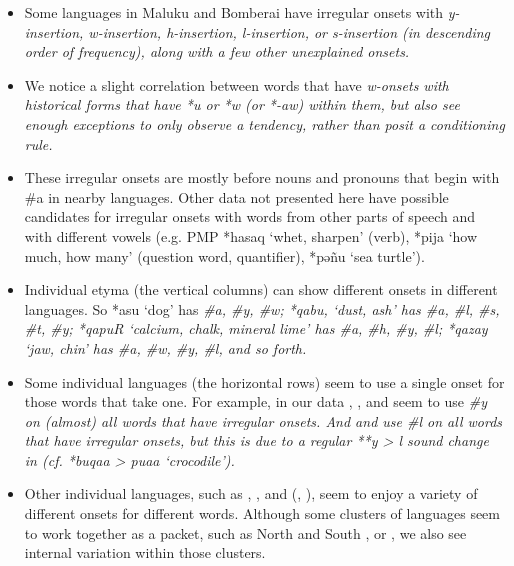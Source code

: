 \begin{itemize}
		\item	Some languages in Maluku
					and Bomberai have irregular onsets with \it{y}-insertion,
					\it{w}-insertion, \it{h}-insertion, \it{l}-insertion, or \it{s}-insertion
					(in descending order of frequency),
					along with a few other unexplained onsets.
		\item	We notice a slight correlation between words that have
					\it{w}-onsets with historical forms that have *u or *w (or *-aw)
					within them, but also see enough exceptions to only observe a tendency,
					rather than posit a conditioning rule.
		\item	These irregular onsets are mostly before nouns
					and pronouns that begin with {\#}a in nearby languages.
					Other data not presented here have possible candidates for irregular
					onsets with words from other parts of speech
					and with different vowels (e.g.
					PMP *hasaq ‘whet, sharpen’ (verb),
					*pija ‘how much, how many’ (question word,
					quantifier), *pəñu ‘sea turtle’).
		\item	Individual etyma (the vertical columns) can show different
					onsets in different languages.
					So *asu ‘dog’ has \it{{\#}a, {\#}y, {\#}w};
					*qabu, ‘dust,
					ash’ has \it{{\#}a, {\#}l, {\#}s, {\#}t, {\#}y};
					*qapuR ‘calcium, chalk,
					mineral lime’ has \it{{\#}a, {\#}h, {\#}y, {\#}l};
					*qazay ‘jaw, chin’ has
					\it{{\#}a, {\#}w, {\#}y, {\#}l}, and so forth.
		\item	Some individual languages (the horizontal rows) seem to
					use a single onset for those words that take one.
					For example, in our data ,
					, and  seem to use \it{{\#}y} on (almost) all words
					that have irregular onsets.
					And  and  use \it{{\#}l} on all words that have
					irregular onsets, but this is due to a regular **y > \it{l}
					sound change in  (cf.
					*buqaa > \it{puaa} ‘crocodile’).
		\item	Other individual languages,
					such as , ,
					and  (,
					), seem to enjoy a variety of different onsets for different words.
					Although some clusters of languages seem to work together as
					a packet, such as North and South , or ,
					we also see internal variation within those clusters.
\end{itemize}

